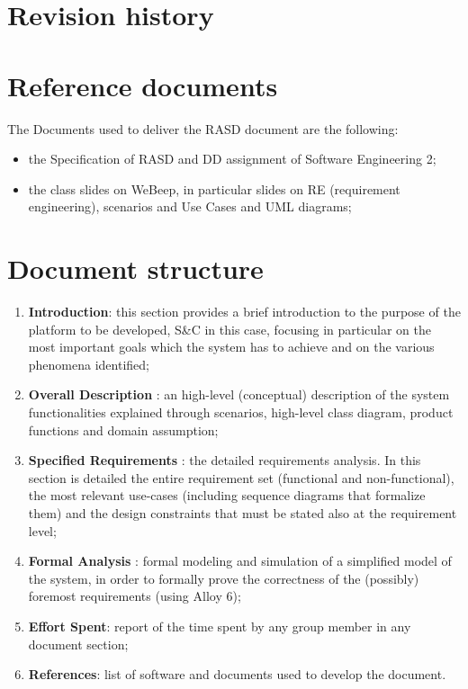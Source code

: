 	\section{Revision history}
		\begin{center}
		\end{center}
	\section{Reference documents}
		The Documents used to deliver the RASD document are the following:
		\begin{itemize}
			\item the Specification of RASD and DD assignment of Software Engineering 2;
			\item the class slides on WeBeep, in particular slides on RE (requirement engineering), scenarios and Use Cases and UML diagrams;
		\end{itemize}
	\section{Document structure}
		\begin{enumerate}
			\item \textbf{Introduction}: this section provides a brief introduction to the purpose of the platform to be developed, S\&C in this case, focusing in particular on the most important goals which the system has to achieve and on the various phenomena identified;
			\item \textbf{Overall Description} : an high-level (conceptual) description of the system functionalities explained through scenarios, high-level class diagram, product functions and domain assumption;
			\item \textbf{Specified Requirements} : the detailed requirements analysis. In this section is detailed the entire requirement set (functional and non-functional), the most relevant use-cases (including sequence diagrams that formalize them) and the design constraints that must be stated also at the requirement level;
			\item \textbf{Formal Analysis} : formal modeling and simulation of a simplified model of the system, in order to formally prove the correctness of the (possibly) foremost requirements (using Alloy 6);
			\item \textbf{Effort Spent}: report of the time spent by any group member in any document section;
			\item \textbf{References}: list of software and documents used to develop the document.
		\end{enumerate}